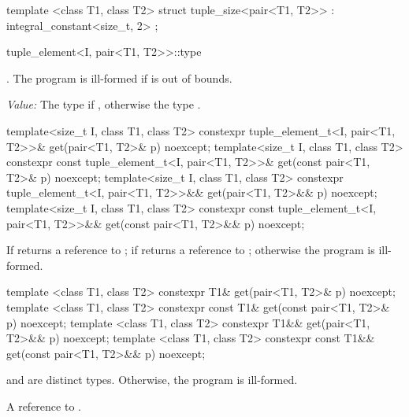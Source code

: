 %
\begin{itemdecl}
template <class T1, class T2>
  struct tuple_size<pair<T1, T2>> : integral_constant<size_t, 2> { };
\end{itemdecl}

%
\begin{itemdecl}
tuple_element<I, pair<T1, T2>>::type
\end{itemdecl}
\begin{itemdescr}
\pnum
\requires {}. The program is ill-formed if  is out of bounds.

\pnum
\textit{Value:} The type  if , otherwise the type .
\end{itemdescr}

%
\begin{itemdecl}
template<size_t I, class T1, class T2>
  constexpr tuple_element_t<I, pair<T1, T2>>& get(pair<T1, T2>& p) noexcept;
template<size_t I, class T1, class T2>
  constexpr const tuple_element_t<I, pair<T1, T2>>& get(const pair<T1, T2>& p) noexcept;
template<size_t I, class T1, class T2>
  constexpr tuple_element_t<I, pair<T1, T2>>&& get(pair<T1, T2>&& p) noexcept;
template<size_t I, class T1, class T2>
  constexpr const tuple_element_t<I, pair<T1, T2>>&& get(const pair<T1, T2>&& p) noexcept;
\end{itemdecl}
\begin{itemdescr}

\pnum
\returns If  returns a reference to ;
if  returns a reference to ;
otherwise the program is ill-formed.
\end{itemdescr}

%
\begin{itemdecl}
template <class T1, class T2>
  constexpr T1& get(pair<T1, T2>& p) noexcept;
template <class T1, class T2>
  constexpr const T1& get(const pair<T1, T2>& p) noexcept;
template <class T1, class T2>
  constexpr T1&& get(pair<T1, T2>&& p) noexcept;
template <class T1, class T2>
  constexpr const T1&& get(const pair<T1, T2>&& p) noexcept;
\end{itemdecl}
\begin{itemdescr}
\pnum
\requires {} and  are distinct types. Otherwise, the program is ill-formed.

\pnum
\returns A reference to .
\end{itemdescr}


